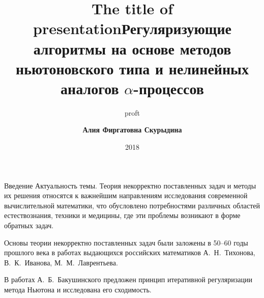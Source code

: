 \documentclass[10pt,pdf, mathserif, hyperref={unicode}]{beamer}
\title{The title of presentation}
\author{proft}
\date{2018}
\begin{document}
	
	\small
	\footnotesize
	
\title[\hspace*{55mm}{\insertpagenumber /\pageref{lastpage}}]{{\small\textbf{Регуляризующие алгоритмы на основе методов 
ньютоновского типа и нелинейных аналогов $\alpha$-процессов}}}
\author[\insertlogo{\em{Алия Фиргатовна Скурыдина}}%
\hspace*{60mm}]{\textbf{\color{blue}Алия Фиргатовна Скурыдина}}
\frame{\titlepage}

\begin{frame}{Введение}{}
%	
	{\color{blue}Актуальность темы.} %
	Теория некорректно поставленных задач и методы их решения относятся к важнейшим направлениям исследования современной вычислительной математики, что обусловлено потребностями различных областей естествознания, техники и медицины, где эти проблемы возникают в форме обратных задач.
	
	\smallskip
	Основы теории некорректно поставленных задач были заложены в 50--60 годы прошлого века в работах выдающихся российских математиков А.~Н.~Тихонова, В.~К.~Иванова, М.~М.~Лаврентьева. %

	В работах А.~Б.~Бакушинского предложен принцип итеративной регуляризации метода Ньютона и исследована его сходимость.
	
\end{frame}
\end{document}
